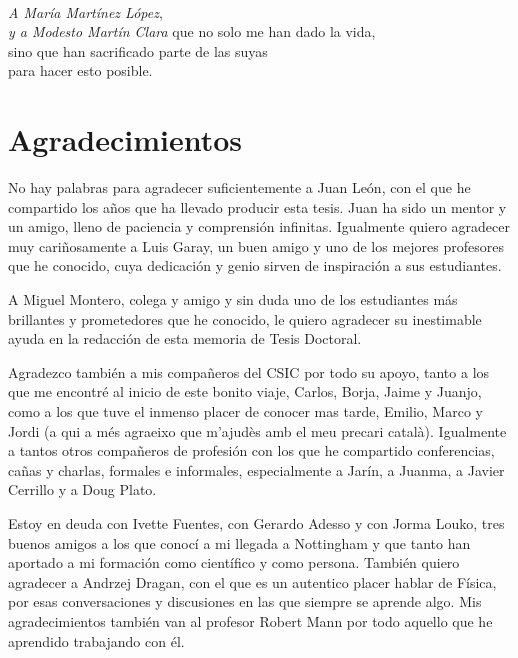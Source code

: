 \thispagestyle{empty}
\begin{flushright}
\ \\ \par
\vspace{7cm}
{\it A Mar\'ia Mart\'inez L\'opez},\\
{\it y a Modesto Mart\'in Clara}
\vskip 0.2cm
que no solo me han dado la vida,\\
sino que han sacrificado parte de las suyas\\
para hacer esto posible.
\end{flushright}

\chapter*{Agradecimientos}
\thispagestyle{empty}


\qquad\!\! No hay palabras para agradecer suficientemente a Juan Le\'on,  con el que he compartido los a\~nos que ha llevado producir esta tesis. Juan ha sido un mentor y un amigo, lleno de paciencia y comprensi\'on infinitas. Igualmente quiero agradecer muy cari\~nosamente a Luis Garay, un buen amigo y uno de los mejores profesores que he conocido, cuya dedicaci\'on y genio sirven de inspiraci\'on a sus estudiantes.


\medskip

A Miguel Montero, colega y amigo y sin duda uno de los estudiantes m\'as brillantes y prometedores que he conocido, le quiero agradecer su inestimable ayuda en la redacci\'on de esta memoria de Tesis Doctoral.

\medskip

Agradezco tambi\'en a mis compa\~neros del CSIC por todo su apoyo, tanto a los que me encontr\'e al inicio de este bonito viaje, Carlos, Borja, Jaime y Juanjo, como  a los que tuve el inmenso placer de conocer mas tarde, Emilio, Marco y Jordi (a qui a m\'es agraeixo que m'ajud\`es amb el meu precari catal\`a). Igualmente a tantos otros compa\~neros de profesi\'on con los que he compartido conferencias, ca\~nas y charlas, formales e informales, especialmente a Jar\'in, a Juanma, a Javier Cerrillo y a Doug Plato.

\medskip

Estoy en deuda con Ivette Fuentes, con Gerardo Adesso y con Jorma Louko, tres buenos amigos a los que conoc\'i a mi llegada a Nottingham y que tanto han aportado a mi formaci\'on como cient\'ifico y como persona. Tambi\'en quiero agradecer a Andrzej Dragan, con el que es un autentico placer hablar de F\'isica, por esas conversaciones y discusiones en las que siempre se aprende algo. Mis agradecimientos tambi\'en van al profesor Robert Mann por todo aquello que he aprendido trabajando con \'el.

